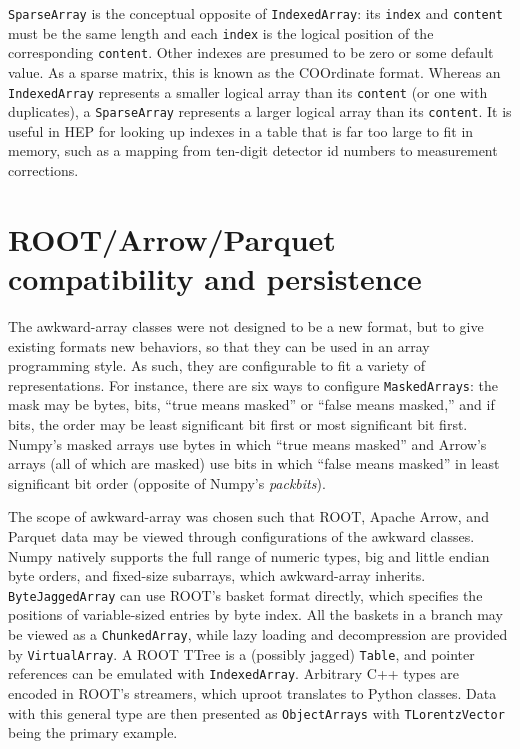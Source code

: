 \documentclass{webofc}
\begin{document}
{\tt\small SparseArray} is the conceptual opposite of {\tt\small IndexedArray}: its {\tt\small index} and {\tt\small content} must be the same length and each {\tt\small index} is the logical position of the corresponding {\tt\small content}. Other indexes are presumed to be zero or some default value. As a sparse matrix, this is known as the COOrdinate format. Whereas an {\tt\small IndexedArray} represents a smaller logical array than its {\tt\small content} (or one with duplicates), a {\tt\small SparseArray} represents a larger logical array than its {\tt\small content}. It is useful in HEP for looking up indexes in a table that is far too large to fit in memory, such as a mapping from ten-digit detector id numbers to measurement corrections.

\section{ROOT/Arrow/Parquet compatibility and persistence}

The awkward-array classes were not designed to be a new format, but to give existing formats new behaviors, so that they can be used in an array programming style. As such, they are configurable to fit a variety of representations. For instance, there are six ways to configure {\tt\small MaskedArrays}: the mask may be bytes, bits, ``true means masked'' or ``false means masked,'' and if bits, the order may be least significant bit first or most significant bit first. Numpy's masked arrays use bytes in which ``true means masked'' and Arrow's arrays (all of which are masked) use bits in which ``false means masked'' in least significant bit order (opposite of Numpy's {\it packbits}).

The scope of awkward-array was chosen such that ROOT, Apache Arrow, and Parquet data may be viewed through configurations of the awkward classes. Numpy natively supports the full range of numeric types, big and little endian byte orders, and fixed-size subarrays, which awkward-array inherits. {\tt\small ByteJaggedArray} can use ROOT's basket format directly, which specifies the positions of variable-sized entries by byte index. All the baskets in a branch may be viewed as a {\tt\small ChunkedArray}, while lazy loading and decompression are provided by {\tt\small VirtualArray}. A ROOT TTree is a (possibly jagged) {\tt\small Table}, and pointer references can be emulated with {\tt\small IndexedArray}. Arbitrary C++ types are encoded in ROOT's streamers, which uproot translates to Python classes. Data with this general type are then presented as {\tt\small ObjectArrays} with {\tt\small TLorentzVector} being the primary example.
\end{document}
